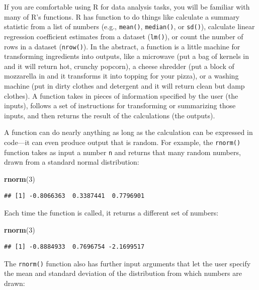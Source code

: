 \documentclass[
]{book}
\newenvironment{Shaded}{\begin{snugshade}}{\end{snugshade}}
\newcommand{\DecValTok}[1]{\textcolor[rgb]{0.00,0.00,0.81}{#1}}
\newcommand{\FunctionTok}[1]{\textcolor[rgb]{0.13,0.29,0.53}{\textbf{#1}}}
\newcommand{\NormalTok}[1]{#1}
\begin{document}
If you are comfortable using R for data analysis tasks, you will be familiar with many of R's functions.
R has function to do things like calculate a summary statistic from a list of numbers (e.g., \texttt{mean()}, \texttt{median()}, or \texttt{sd()}), calculate linear regression coefficient estimates from a dataset (\texttt{lm()}), or count the number of rows in a dataset (\texttt{nrow()}).
In the abstract, a function is a little machine for transforming ingredients into outputs, like a microwave (put a bag of kernels in and it will return hot, crunchy popcorn), a cheese shredder (put a block of mozzarella in and it transforms it into topping for your pizza), or a washing machine (put in dirty clothes and detergent and it will return clean but damp clothes).
A function takes in pieces of information specified by the user (the inputs), follows a set of instructions for transforming or summarizing those inputs, and then returns the result of the calculations (the outputs).

A function can do nearly anything as long as the calculation can be expressed in code---it can even produce output that is random.
For example, the \texttt{rnorm()} function takes as input a number \texttt{n} and returns that many random numbers, drawn from a standard normal distribution:

\begin{Shaded}
\begin{Highlighting}[]
\FunctionTok{rnorm}\NormalTok{(}\DecValTok{3}\NormalTok{)}
\end{Highlighting}
\end{Shaded}

\begin{verbatim}
## [1] -0.8066363  0.3387441  0.7796901
\end{verbatim}

Each time the function is called, it returns a different set of numbers:

\begin{Shaded}
\begin{Highlighting}[]
\FunctionTok{rnorm}\NormalTok{(}\DecValTok{3}\NormalTok{)}
\end{Highlighting}
\end{Shaded}

\begin{verbatim}
## [1] -0.8884933  0.7696754 -2.1699517
\end{verbatim}

The \texttt{rnorm()} function also has further input arguments that let the user specify the mean and standard deviation of the distribution from which numbers are drawn:
\end{document}
